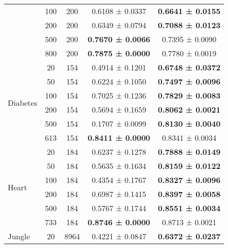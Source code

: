 \begin{table}[H]
{\begin{tabular}[H]{@{}lcccc@{}}
                              & 100         & 200  & 0.6108 ± 0.0337          & \textbf{0.6641 ± 0.0155} \\
                              & 200         & 200  & 0.6349 ± 0.0794          & \textbf{0.7088 ± 0.0123} \\
                              & 500         & 200  & \textbf{0.7670 ± 0.0066} & 0.7395 ± 0.0090          \\
                              & 800         & 200  & \textbf{0.7875 ± 0.0000} & 0.7780 ± 0.0019          \\
                              \midrule
\multirow{6}{*}{Diabetes}     & 20          & 154  & 0.4914 ± 0.1201          & \textbf{0.6748 ± 0.0372} \\
                              & 50          & 154  & 0.6224 ± 0.1050          & \textbf{0.7497 ± 0.0096} \\
                              & 100         & 154  & 0.7025 ± 0.1236          & \textbf{0.7829 ± 0.0083} \\
                              & 200         & 154  & 0.5694 ± 0.1659          & \textbf{0.8062 ± 0.0021} \\
                              & 500         & 154  & 0.1707 ± 0.0099          & \textbf{0.8130 ± 0.0040} \\
                              & 613         & 154  & \textbf{0.8411 ± 0.0000} & 0.8341 ± 0.0034          \\
                              \midrule
\multirow{6}{*}{Heart}        & 20          & 184  & 0.6237 ± 0.1278          & \textbf{0.7888 ± 0.0149} \\
                              & 50          & 184  & 0.5635 ± 0.1634          & \textbf{0.8159 ± 0.0122} \\
                              & 100         & 184  & 0.4354 ± 0.1767          & \textbf{0.8327 ± 0.0096} \\
                              & 200         & 184  & 0.6987 ± 0.1415          & \textbf{0.8397 ± 0.0058} \\
                              & 500         & 184  & 0.5767 ± 0.1744          & \textbf{0.8551 ± 0.0034} \\
                              & 733         & 184  & \textbf{0.8746 ± 0.0000} & 0.8713 ± 0.0021          \\
                              \midrule
\multirow{7}{*}{Jungle}       & 20          & 8964 & 0.4221 ± 0.0847          & \textbf{0.6372 ± 0.0237} \\

\end{tabular}}
\end{table}
